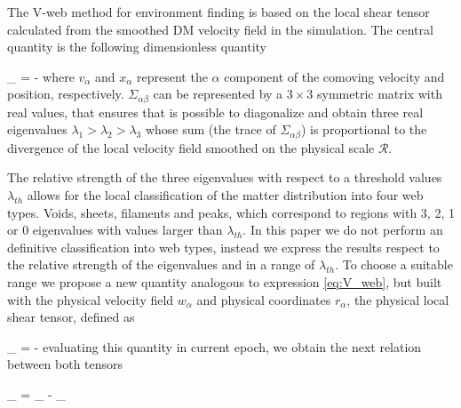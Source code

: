 \documentclass[usenatbib]{mn2e}
\begin{document}
The V-web method for environment finding is based on the local shear 
tensor calculated from the smoothed DM velocity field in the simulation.
The central quantity is the following dimensionless quantity 


{
\Sigma_{\alpha\beta} = -
}
where $v_{\alpha}$ and $x_{\alpha}$ represent the $\alpha$ component of 
the comoving velocity and position, respectively. $\Sigma_{\alpha\beta}$ 
can be represented by a $3\times 3$ symmetric matrix with real values, 
that ensures that is possible to diagonalize and obtain three real 
eigenvalues $\lambda_{1} > \lambda_{2}>\lambda_3$ whose sum (the trace of
$\Sigma_{\alpha\beta}$) is proportional to the divergence of the local 
velocity field smoothed on the physical scale ${\mathcal R}$. 


The relative strength of the three eigenvalues with respect to a threshold
values $\lambda_{th}$ allows for the local classification of the matter 
distribution into four web types. Voids, sheets, filaments and peaks, 
which correspond to regions with 3, 2, 1 or 0 eigenvalues with values 
larger than $\lambda_{th}$. In this paper we do not perform an definitive 
classification into web types, instead we express the results respect to 
the relative strength of the eigenvalues and in a range of $\lambda_{th}$.
To choose a suitable range we propose a new quantity analogous to 
expression \ref{eq:V_web}, but built with the physical velocity field 
$w_{\alpha}$ and physical coordinates $r_{\alpha}$, the physical local 
shear tensor, defined as 


{
\Pi_{\alpha\beta} = -
}
evaluating this quantity in current epoch, we obtain the next relation 
between both tensors


{ \Pi_{\alpha\beta} = \Sigma_{\alpha\beta} - \delta_{\alpha\beta} }
\end{document}
